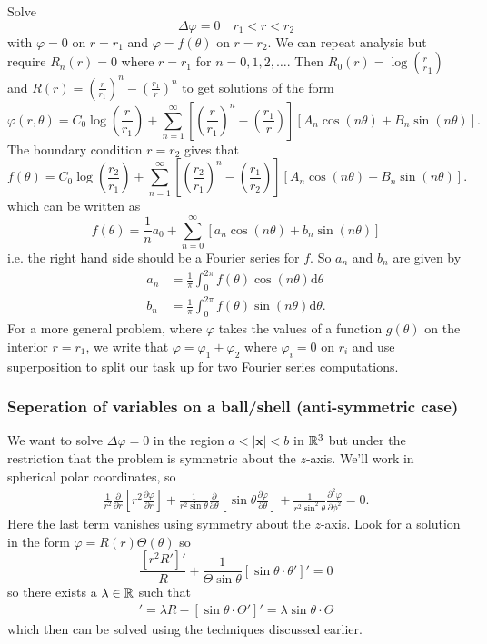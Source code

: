 \documentclass{article}
\begin{document}
Solve
\[
  \Delta\varphi=0\quad r_1<r<r_2
\]
with $ \varphi=0 $ on $ r=r_1 $ and $ \varphi=f(\theta) $ on $ r=r_2 $. We can repeat analysis but require $ R_n(r)=0 $ where $ r=r_1 $ for $ n=0,1,2,\dots $. Then $ R_0(r)=\log\left(\frac rr_1\right) $ and $ R(r)=\left(\frac r{r_1}\right)^n-\left(\frac{r_1}r\right)^n $ to get solutions of the form
\[
	\varphi(r,\theta)=C_0\log\left(\frac r{r_1}\right)+\sum_{n=1}^\infty \left[\left(\frac r{r_1}\right)^n-\left(\frac{r_1}r\right)\right]\left[A_n\cos(n\theta)+B_n\sin(n\theta)\right].
\]
The boundary condition $ r=r_2 $ gives that
\[
	f(\theta)=C_0\log\left(\frac {r_2}{r_1}\right)+\sum_{n=1}^\infty \left[\left(\frac {r_2}{r_1}\right)^n-\left(\frac{r_1}{r_2}\right)\right]\left[A_n\cos(n\theta)+B_n\sin(n\theta)\right].
\]
which can be written as
\[
	f(\theta)=\frac 1na_0+\sum_{n=0}^\infty \left[ a_n\cos(n\theta) + b_n\sin(n\theta)\right]
\]
i.e. the right hand side should be a Fourier series for $ f $. So $ a_n $ and $ b_n $ are given by
\begin{align*}
	a_n&=\frac 1\pi\int_0^{2\pi} f(\theta)\cos(n\theta)\mathrm d\theta \\
	b_n&= \frac 1\pi\int_0^{2\pi} f(\theta)\sin(n\theta)\mathrm d\theta.
\end{align*}
For a more general problem, where $ \varphi $ takes the values of a function $ g(\theta) $ on the interior $ r=r_1 $, we write that $ \varphi=\varphi_1+\varphi_2 $ where $ \varphi_i=0 $ on $ r_i $ and use superposition to split our task up for two Fourier series computations.
\subsubsection{Seperation of variables on a ball/shell (anti-symmetric case)}
We want to solve $ \Delta\varphi=0 $ in the region $ a<|\mathbf x|<b  $ in $ \mathbb{R}^3 $ but under the restriction that the problem is symmetric about the $ z $-axis. We'll work in spherical polar coordinates, so
\begin{align*}
	\frac 1{r^2}\frac\partial{\partial r}\left[r^2\frac{\partial \varphi}{\partial r}\right]+\frac 1{r^2\sin\theta}\frac{\partial}{\partial \theta}\left[\sin\theta\frac{\partial \varphi}{\partial\theta}\right]+\frac{1}{r^2\sin^2\theta}\frac{\partial^2\varphi}{\partial \phi^2}=0.
\end{align*}
Here the last term vanishes using symmetry about the $ z $-axis. Look for a solution in the form $ \varphi=R(r)\Theta(\theta) $ so
\[
	\frac{[r^2R']'}R+\frac1 {\Theta\sin\theta}[\sin\theta\cdot\theta']'=0
\]
so there exists a $ \lambda\in\mathbb{R} $ such that
\begin{align*}
	[r^2R']'=\lambda R-[\sin\theta\cdot \Theta']'=\lambda\sin\theta\cdot\Theta
\end{align*}
which then can be solved using the techniques discussed earlier.
\end{document}
